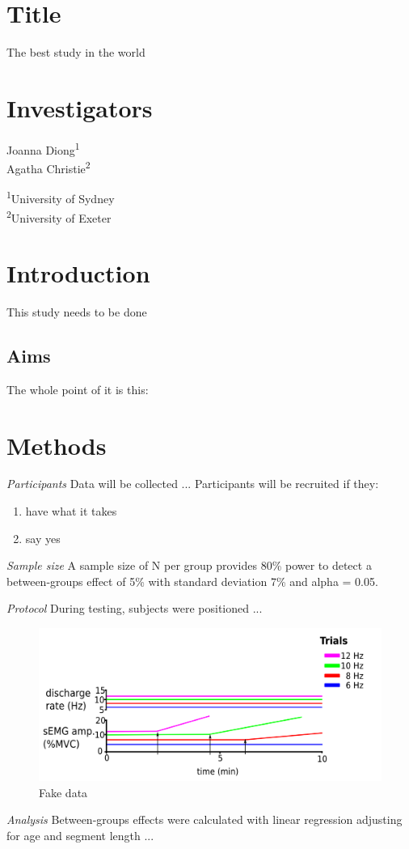 \documentclass[11pt,a4paper]{article}
\newcommand{\projectpath}{/home/joanna/Dropbox/Sketchbook/python/project_template}
\begin{document}
\setcounter{page}{1}

\section*{Title}
The best study in the world

\section*{Investigators}
Joanna Diong\textsuperscript{1} \\
Agatha Christie\textsuperscript{2} 

\textsuperscript{1}University of Sydney \\
\textsuperscript{2}University of Exeter

\section*{Introduction}
This study needs to be done \citep{Pascoe2014}

\subsection*{Aims}
The whole point of it is this:

\section*{Methods}

\textit{Participants} Data will be collected ... Participants will be recruited if they:
\begin{enumerate}
	\item have what it takes
	\item say yes
\end{enumerate}

\textit{Sample size} A sample size of N per group provides 80\% power to detect a between-groups effect of 5\% with standard deviation 7\% and alpha = 0.05.

\textit{Protocol} During testing, subjects were positioned ...

\begin{figure}[!htbp]
\centering
\includegraphics[scale=0.75]{./img/fake_data.png}
\captionsetup{justification=centering}
\caption{Fake data}
\end{figure}

\textit{Analysis} Between-groups effects were calculated with linear regression adjusting for age and segment length ...

\newpage


 
\end{document}
